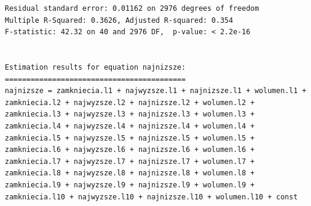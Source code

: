 \documentclass[
  polish,
  letterpaper,
  DIV=11,
  numbers=noendperiod]{scrartcl}
\begin{document}
\begin{verbatim}
Residual standard error: 0.01162 on 2976 degrees of freedom
Multiple R-Squared: 0.3626, Adjusted R-squared: 0.354 
F-statistic: 42.32 on 40 and 2976 DF,  p-value: < 2.2e-16 


Estimation results for equation najnizsze: 
========================================== 
najnizsze = zamkniecia.l1 + najwyzsze.l1 + najnizsze.l1 + wolumen.l1 + zamkniecia.l2 + najwyzsze.l2 + najnizsze.l2 + wolumen.l2 + zamkniecia.l3 + najwyzsze.l3 + najnizsze.l3 + wolumen.l3 + zamkniecia.l4 + najwyzsze.l4 + najnizsze.l4 + wolumen.l4 + zamkniecia.l5 + najwyzsze.l5 + najnizsze.l5 + wolumen.l5 + zamkniecia.l6 + najwyzsze.l6 + najnizsze.l6 + wolumen.l6 + zamkniecia.l7 + najwyzsze.l7 + najnizsze.l7 + wolumen.l7 + zamkniecia.l8 + najwyzsze.l8 + najnizsze.l8 + wolumen.l8 + zamkniecia.l9 + najwyzsze.l9 + najnizsze.l9 + wolumen.l9 + zamkniecia.l10 + najwyzsze.l10 + najnizsze.l10 + wolumen.l10 + const 


\end{verbatim}
\end{document}
